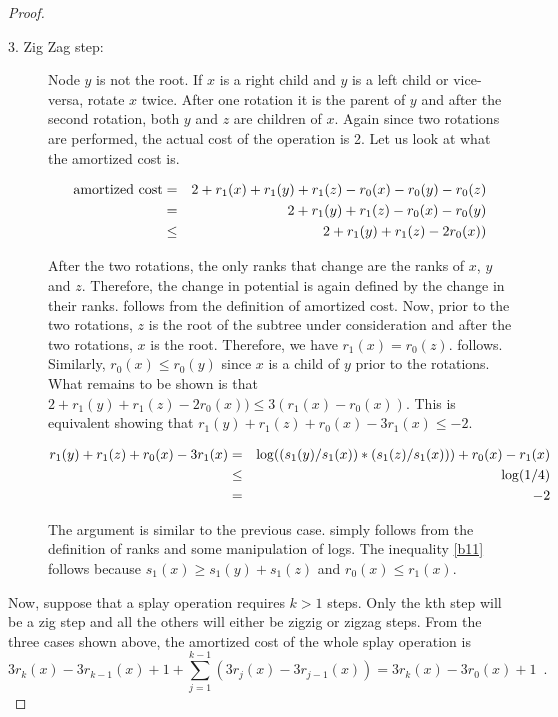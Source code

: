 {\begin{proof}
\begin{description}
 
\item[3. Zig Zag step:] Node $y$ is not the root. If $x$ is a right
child and $y$ is a left child or vice-versa, rotate $x$ twice. After
one rotation it is the parent of $y$ and after the second rotation,
both $y$ and $z$ are children of $x$. Again since two rotations are
performed, the actual cost of the operation is 2. Let us look at what
the amortized cost is.

\begin{eqnarray}
\mbox{amortized cost} & =  & 2 + r_1(x) + r_1(y) + r_1(z) - r_0(x) -r_0(y) - r_0(z) \eqlabel{b7}\\
                      & =  & 2 + r_1(y) + r_1(z) - r_0(x) - r_0(y) 
	\eqlabel{b8}\\
                      &\leq& 2 + r_1(y) + r_1(z) - 2r_0(x)) 
	\eqlabel{b9}\\
\end{eqnarray}

After the two rotations, the only ranks that change are the ranks of
$x$, $y$ and $z$. Therefore, the change in potential is again defined
by the change in their ranks.  follows from the
definition of amortized cost. Now, prior to the two rotations, $z$ is
the root of the subtree under consideration and after the two
rotations, $x$ is the root. Therefore, we have $r_1(x) =
r_0(z)$.  follows. Similarly, $r_0(x) \leq r_0(y)$
since $x$ is a child of $y$ prior to the rotations. What remains to be
shown is that $2 + r_1(y) + r_1(z) - 2r_0(x)) \leq 3(r_1(x) -
r_0(x))$. This is equivalent showing that $r_1(y) + r_1(z) + r_0(x) -
3r_1(x) \leq -2$.

\begin{eqnarray}
r_1(y) + r_1(z) + r_0(x) - 3r_1(x) & = & \log((s_1(y)/s_1(x))*(s_1(z)/s_1(x))) + r_0(x) - r_1(x) \eqlabel{b10}\\
                       &\leq& \log(1/4)
	\eqlabel{b11}\\
                       & = & -2
\end{eqnarray}

The argument is similar to the previous case. 
simply follows from the definition of ranks and some manipulation of
logs. The inequality \eqref{b11} follows because $s_1(x)\geq s_1(y) +
s_1(z)$ and $r_0(x) \leq r_1(x)$.
\end{description}

Now, suppose that a splay operation requires $k>1$ steps. Only the kth
step will be a zig step and all the others will either be zigzig or
zigzag steps. From the three cases shown above, the amortized cost of
the whole splay operation is
\[
3r_k(x) - 3r_{k-1}(x) + 1 + \sum_{j=1}^{k-1} (3r_{j}(x) - 3r_{j-1}(x)) =
3r_k(x) - 3r_0(x) + 1 \enspace .
\]  
\end{proof}

}
